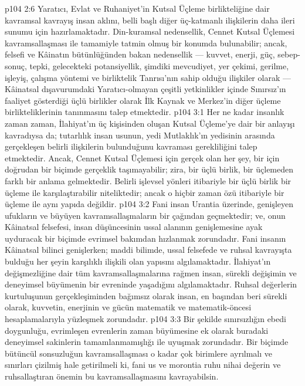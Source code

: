 \vs p104 2:6 Yaratıcı, Evlat ve Ruhaniyet’in Kutsal Üçleme birlikteliğine dair kavramsal kavrayış insan aklını, belli başlı diğer üç\hyp{}katmanlı ilişkilerin daha ileri sunumu için hazırlamaktadır. Din\hyp{}kuramsal nedensellik, Cennet Kutsal Üçlemesi kavramsallaşması ile tamamiyle tatmin olmuş bir konumda bulunabilir; ancak, felsefi ve Kâinatın bütünlüğünden bakan nedensellik --- kuvvet, enerji, güç, sebep\hyp{}sonuç, tepki, gelecekteki potansiyellik, şimdiki mevcudiyet, yer çekimi, gerilme, işleyiş, çalışma yöntemi ve birliktelik Tanrısı’nın sahip olduğu ilişkiler olarak --- Kâinatsal dışavurumdaki Yaratıcı\hyp{}olmayan çeşitli yetkinlikler içinde Sınırsız’ın faaliyet gösterdiği üçlü birlikler olarak İlk Kaynak ve Merkez’in diğer üçleme birlikteliklerinin tanınmasını talep etmektedir.
\vs p104 3:1 Her ne kadar insanlık zaman zaman, İlahiyat’ın üç kişisinden oluşan Kutsal Üçleme’ye dair bir anlayışı kavradıysa da; tutarlılık insan usunun, yedi Mutlaklık’ın yedisinin arasında gerçekleşen belirli ilişkilerin bulunduğunu kavraması gerekliliğini talep etmektedir. Ancak, Cennet Kutsal Üçlemesi için gerçek olan her şey, bir  için doğrudan bir biçimde gerçeklik taşımayabilir; zira, bir üçlü birlik, bir üçlemeden farklı bir anlama gelmektedir. Belirli işlevsel yönleri itibariyle bir üçlü birlik bir üçleme ile karşılaştırabilir niteliktedir; ancak o hiçbir zaman özü itibariyle bir üçleme ile aynı yapıda değildir.
\vs p104 3:2 Fani insan Urantia üzerinde, genişleyen ufukların ve büyüyen kavramsallaşmaların bir çağından geçmektedir; ve, onun Kâinatsal felsefesi, insan düşüncesinin ussal alanının genişlemesine ayak uyduracak bir biçimde evrimsel bakımdan hızlanmak zorundadır. Fani insanın Kâinatsal bilinci genişlerken; maddi bilimde, ussal felsefede ve ruhsal kavrayışta bulduğu her şeyin karşılıklı ilişkili olan yapısını algılamaktadır. İlahiyat’ın değişmezliğine dair tüm kavramsallaşmalarına rağmen insan, sürekli değişimin ve deneyimsel büyümenin bir evreninde yaşadığını algılamaktadır. Ruhsal değerlerin kurtuluşunun gerçekleşiminden bağımsız olarak insan, en başından beri sürekli olarak, kuvvetin, enerjinin ve gücün matematik ve matematik\hyp{}öncesi hesaplamalarıyla yüzleşmek zorundadır.
\vs p104 3:3 Bir şekilde sınırsızlığın ebedi doygunluğu, evrimleşen evrenlerin zaman büyümesine ek olarak buradaki deneyimsel sakinlerin tamamlanmamışlığı ile uyuşmak zorundadır. Bir biçimde bütüncül sonsuzluğun kavramsallaşması o kadar çok birimlere ayrılmalı ve sınırları çizilmiş hale getirilmeli ki, fani us ve morontia ruhu nihai değerin ve ruhsallaştıran önemin bu kavramsallaşmasını kavrayabilsin.
